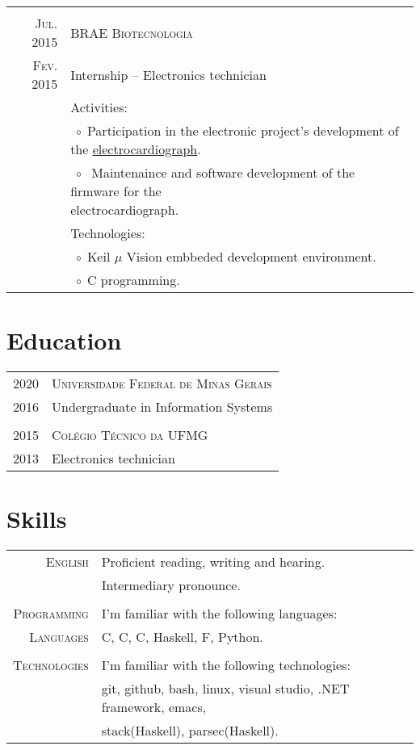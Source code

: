 \documentclass[a4paper,10pt]{article}
\newcommand{\tabitem}{$\;\circ\;$}
\newcommand{\cpp}{C\protect\scalebox{0.8}{\protect\raisebox{0.4ex}{++}}}
\renewcommand\#{\protect\scalebox{0.8}{\protect\raisebox{0.4ex}{\char"0023}}}
\begin{document}
\begin{tabular}{r|p{12.3cm}}
  \multicolumn{2}{c}{} \\
  \textsc{Jul. 2015} & \textsc{BRAE Biotecnologia} \\
  \textsc{Fev. 2015} & Internship -- Electronics technician \\[5pt]
  & Activities: \\
  & \tabitem Participation in the electronic project's development of the \href{http://www.ferox.vet.br/pt-br/produtos/ecg-veterinario.aspx}{electrocardiograph}. \\
  & \tabitem \makecell[lt]{
              Maintenaince and software development of the firmware for the \\
              electrocardiograph.
             } \\
  & Technologies: \\
  & \tabitem Keil $\mu$ \kern-5pt Vision embbeded development environment. \\
  & \tabitem C programming.
\end{tabular}


\section{Education}
\begin{tabular}{r|l}
  \textsc{2020} & \textsc{Universidade Federal de Minas Gerais} \\
  \textsc{2016} & Undergraduate in Information Systems \\
  
  \multicolumn{2}{c}{} \\
  \textsc{2015} & \textsc{Colégio Técnico da UFMG} \\
  \textsc{2013} & Electronics technician \\
\end{tabular}


\section{Skills}
\begin{tabular}{r|l}
  \textsc{English} & Proficient reading, writing and hearing. \\
  & Intermediary pronounce. \\
  
  \multicolumn{2}{c}{} \\
  \textsc{Programming} & I'm familiar with the following languages: \\
  \textsc{Languages} & C, \cpp, C\#, Haskell, F\#, Python. \\
  
  \multicolumn{2}{c}{} \\
  \textsc{Technologies} & I'm familiar with the following technologies: \\
  & git, github, bash, linux, visual studio, .NET framework, emacs, \\
  & stack(Haskell), parsec(Haskell).
\end{tabular}
\end{document}
